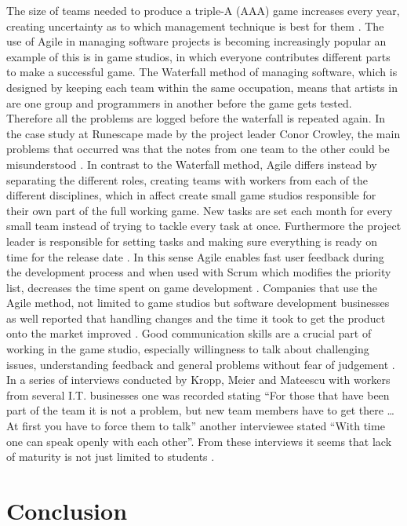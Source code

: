 \documentclass{scrartcl}
\begin{document}
The size of teams needed to produce a triple-A (AAA) game increases every year, creating uncertainty as to which management technique is best for them \cite{mateos2008adopting} \cite{mcguire2006paper}. The use of Agile in managing software projects is becoming increasingly popular\cite{one2012state} an example of this is in game studios, in which everyone contributes different parts to make a successful game. The Waterfall method of managing software, which is designed by keeping each team within the same occupation, means that  artists in are one group and programmers in another before the game gets tested. Therefore all the problems are logged before the waterfall is repeated again. In the case study at Runescape made by the project leader Conor Crowley, the main problems that occurred was that the notes from one team to the other could be misunderstood \cite{snapp2008accidental}. In contrast to the Waterfall method, Agile differs instead by separating the different roles, creating teams with workers from each of the different disciplines, which in affect create small game studios responsible for their own part of the full working game. New tasks are set each month for every small team instead of trying to tackle every task at once. Furthermore the project leader is responsible for setting tasks and making sure everything is ready on time for the release date \cite{Crowley2016GDC}. In this sense Agile enables fast user feedback during the development process and when used with Scrum which modifies the priority list, decreases the time spent on game development \cite{mateos2008adopting}. Companies that use the Agile method, not limited to game studios but software development businesses as well reported that handling changes and the time it took to get the product onto the market improved \cite{kropp2013swiss}. Good communication skills are a crucial part of working in the game studio, especially willingness to talk about challenging issues, understanding feedback and general problems without fear of judgement \cite{kropp2014teaching}. In a series of interviews conducted by Kropp, Meier and Mateescu with workers from several I.T. businesses one was recorded stating “For those that have been part of the team it is not a problem, but new team members have to get there … At first you have to force them to talk” another interviewee stated “With time one can speak openly with each other”. From these interviews it seems that lack of maturity is not just limited to students \cite{kropp2014teaching}.

\section{Conclusion}
\end{document}
